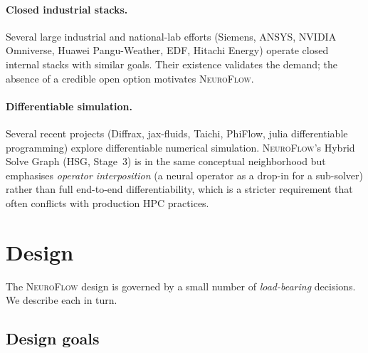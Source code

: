 \documentclass[10pt,twocolumn]{article}
\renewcommand{\texttt}[1]{{\normalfont\ttfamily #1}\normalfont\rmfamily}
\newcommand{\nf}{\textsc{NeuroFlow}}
\begin{document}
\paragraph{Closed industrial stacks.}
Several large industrial and national-lab efforts (Siemens, ANSYS,
NVIDIA Omniverse, Huawei Pangu-Weather, EDF, Hitachi Energy) operate
closed internal stacks with similar goals.  Their existence
validates the demand; the absence of a credible open option
motivates \nf{}.

\paragraph{Differentiable simulation.}
Several recent projects (Diffrax, jax-fluids, Taichi, PhiFlow,
\texttt{julia differentiable programming}) explore differentiable
numerical simulation.  \nf{}'s Hybrid Solve Graph (HSG, Stage~3) is
in the same conceptual neighborhood but emphasises \emph{operator
interposition} (a neural operator as a drop-in for a sub-solver)
rather than full end-to-end differentiability, which is a stricter
requirement that often conflicts with production HPC practices.

\section{Design}
\label{sec:design}

The \nf{} design is governed by a small number of \emph{load-bearing}
decisions.  We describe each in turn.

\subsection{Design goals}
\end{document}
